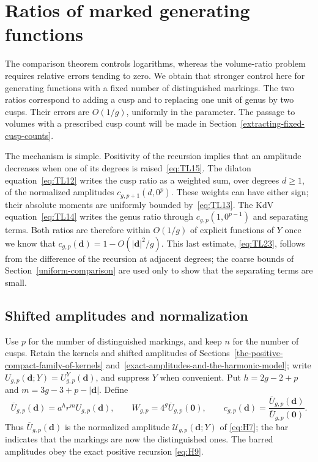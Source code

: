 \section{Ratios of marked generating functions}\label{ratios-with-a-fixed-number-of-distinguished-markings}

The comparison theorem controls logarithms, whereas the volume-ratio
problem requires relative errors tending to zero. We obtain that stronger
control here for generating functions with a fixed number of distinguished
markings. The two ratios correspond to adding a cusp and to replacing one
unit of genus by two cusps. Their errors are $O(1/g)$, uniformly in the
parameter. The passage to volumes with a prescribed cusp count will be
made in Section~\ref{extracting-fixed-cusp-counts}.

The mechanism is simple. Positivity of the recursion implies that an
amplitude decreases when one of its degrees is raised~\eqref{eq:TL15}.
The dilaton equation~\eqref{eq:TL12} writes the cusp ratio as a weighted
sum, over degrees \(d\ge1\), of the normalized amplitudes
\(c_{g,p+1}(d,0^p)\). These weights can have either sign; their absolute
moments are uniformly bounded by~\eqref{eq:TL13}. The KdV equation~\eqref{eq:TL14} writes the
genus ratio through \(c_{g,p}(1,0^{p-1})\) and separating terms. Both
ratios are therefore within \(O(1/g)\) of explicit functions of \(Y\) once
we know that \(c_{g,p}(\mathbf d)=1-O(|\mathbf d|^2/g)\). This last estimate,
\eqref{eq:TL23}, follows from the difference of the recursion at adjacent
degrees; the coarse bounds of Section~\ref{uniform-comparison} are used
only to show that the separating terms are small.

\subsection{Shifted amplitudes and normalization}\label{shifted-amplitudes-and-normalization}

Use \(p\) for the number of distinguished markings, and keep \(n\) for the number of cusps. Retain the kernels and shifted amplitudes of Sections~\ref{the-positive-compact-family-of-kernels} and~\ref{exact-amplitudes-and-the-harmonic-model}; write \(U_{g,p}(\mathbf d;Y)=U^Y_{g,p}(\mathbf d)\), and suppress \(Y\) when convenient. Put \(h=2g-2+p\) and \(m=3g-3+p-|\mathbf d|\). Define \begin{equation}
\overline U_{g,p}(\mathbf d)=a^h r^m U_{g,p}(\mathbf d),
 \qquad W_{g,p}=4^g\overline U_{g,p}(\mathbf0),
 \qquad c_{g,p}(\mathbf d)=
 \frac{\overline U_{g,p}(\mathbf d)}{\overline U_{g,p}(\mathbf0)}.
 \label{eq:TL9}
\end{equation} Thus $\overline U_{g,p}(\mathbf d)$ is the normalized amplitude $\mathcal U_{g,p}(\mathbf d;Y)$ of \eqref{eq:H7}; the bar indicates that the markings are now the distinguished ones. The barred amplitudes obey the exact positive recursion \eqref{eq:H9}.

